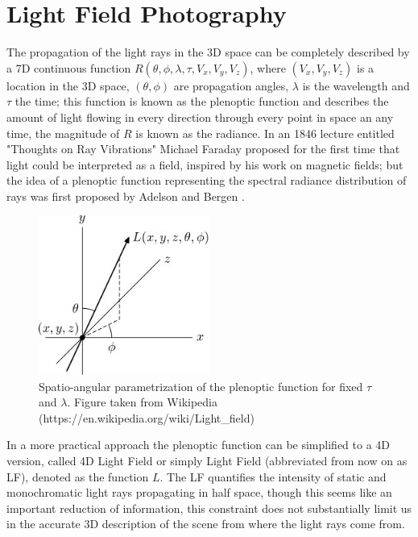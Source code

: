 
\chapter{Light Field Photography}

The propagation of the light rays in the 3D space can be completely described by a 7D continuous function $R(\theta,\phi,\lambda,\tau,V_x,V_y,V_z)$, where $(V_x,V_y,V_z)$ is a location in the 3D space, $(\theta,\phi)$ are propagation angles, $\lambda$ is the wavelength and $\tau$ the time; this function is known as the plenoptic function and describes the amount of light flowing in every direction through every point in space an any time, the magnitude of $R$ is known as the radiance.  In an 1846 lecture entitled "Thoughts on Ray Vibrations" Michael Faraday proposed for the first time that light could be interpreted as a field, inspired by his work on magnetic fields; but the idea of a plenoptic function representing the spectral radiance distribution of rays was first proposed by Adelson and Bergen \cite{Adelson-Plenoptic}. 

\bigskip

\begin{figure}[h!]
\centering
\includegraphics[width=0.5\textwidth]{./Diagrams/Plenoptic_function.jpg}
\caption{Spatio-angular parametrization of the plenoptic function for fixed $\tau$ and $\lambda$. Figure taken from Wikipedia (https://en.wikipedia.org/wiki/Light\_field)}
\end{figure}

\bigskip

In a more practical approach the plenoptic function can be simplified to a 4D version, called 4D Light Field or simply Light Field (abbreviated from now on as LF), denoted as the function $L$. The LF quantifies the intensity of static and monochromatic light rays propagating in half space, though this seems like an important reduction of information, this constraint does not substantially limit us in the accurate 3D description of the scene from where the light rays come from.

